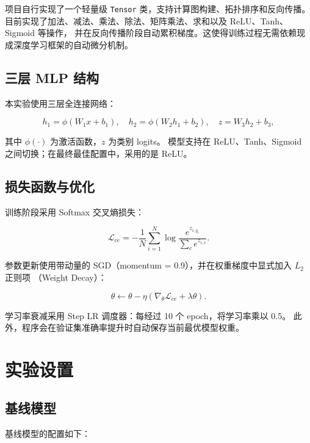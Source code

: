 \documentclass[12pt,a4paper,fontset=none]{ctexart}
\begin{document}
项目自行实现了一个轻量级 \texttt{Tensor} 类，支持计算图构建、拓扑排序和反向传播。
目前实现了加法、减法、乘法、除法、矩阵乘法、求和以及 ReLU、Tanh、Sigmoid 等操作，
并在反向传播阶段自动累积梯度。这使得训练过程无需依赖现成深度学习框架的自动微分机制。

\subsection{三层 MLP 结构}

本实验使用三层全连接网络：

\begin{equation}
    h_1 = \phi(W_1 x + b_1), \quad
    h_2 = \phi(W_2 h_1 + b_2), \quad
    z = W_3 h_2 + b_3,
\end{equation}

其中 $\phi(\cdot)$ 为激活函数，$z$ 为类别 logits。
模型支持在 ReLU、Tanh、Sigmoid 之间切换；在最终最佳配置中，采用的是 ReLU。

\subsection{损失函数与优化}

训练阶段采用 Softmax 交叉熵损失：

\begin{equation}
    \mathcal{L}_{ce} =
    - \frac{1}{N} \sum_{i=1}^{N}
    \log \frac{e^{z_{i,y_i}}}{\sum_{c} e^{z_{i,c}}}.
\end{equation}

参数更新使用带动量的 SGD（momentum = 0.9），并在权重梯度中显式加入 $L_2$ 正则项
（Weight Decay）：

\begin{equation}
    \theta \leftarrow \theta - \eta \left( \nabla_{\theta}\mathcal{L}_{ce} + \lambda \theta \right).
\end{equation}

学习率衰减采用 Step LR 调度器：每经过 10 个 epoch，将学习率乘以 0.5。
此外，程序会在验证集准确率提升时自动保存当前最优模型权重。

\section{实验设置}

\subsection{基线模型}

基线模型的配置如下：
\end{document}
